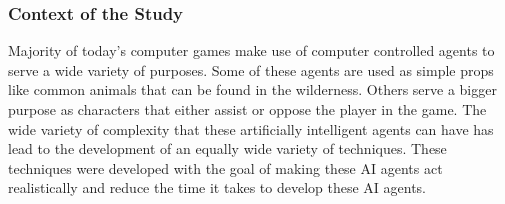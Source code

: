 \subsubsection*{Context of the Study}
Majority of today's computer games make use of computer controlled agents to serve a wide
variety of purposes. Some of these agents are used as simple props like common animals that
can be found in the wilderness. Others serve a bigger purpose as characters that either assist
or oppose the player in the game. The wide variety of complexity that these artificially
intelligent agents can have has lead to the development of an equally wide variety of techniques.
These techniques were developed with the goal of making these AI agents act realistically and reduce
the time it takes to develop these AI agents.